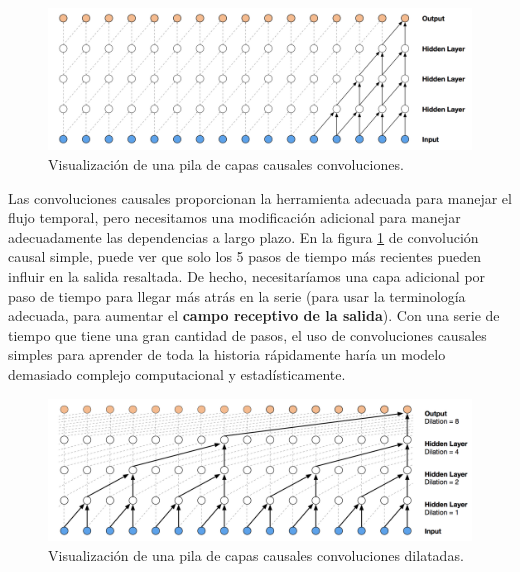 \documentclass[a4paper,12pt]{article}
\begin{document}
\begin{figure}[H]
	\begin{center}				
	\includegraphics[width=1\textwidth]{stackcausal-conv.png}
  	\caption{Visualización de una pila de capas causales convoluciones.}
  	\label{fig:stackcausal-conv}
  	\end{center}
\end{figure}

Las convoluciones causales proporcionan la herramienta adecuada para manejar el flujo temporal, pero necesitamos una modificación adicional para manejar adecuadamente las dependencias a largo plazo. En la figura \ref{fig:stackcausal-conv} de convolución causal simple, puede ver que solo los 5 pasos de tiempo más recientes pueden influir en la salida resaltada. De hecho, necesitaríamos una capa adicional por paso de tiempo para llegar más atrás en la serie (para usar la terminología adecuada, para aumentar el \textbf{campo receptivo de la salida}). Con una serie de tiempo que tiene una gran cantidad de pasos, el uso de convoluciones causales simples para aprender de toda la historia rápidamente haría un modelo demasiado complejo computacional y estadísticamente.

\begin{figure}[H]
	\begin{center}				
	\includegraphics[width=1\textwidth]{dilated-conv.png}
  	\caption{Visualización de una pila de capas causales convoluciones dilatadas.}
  	\label{fig:dilated-conv}
  	\end{center}
\end{figure}
\end{document}

